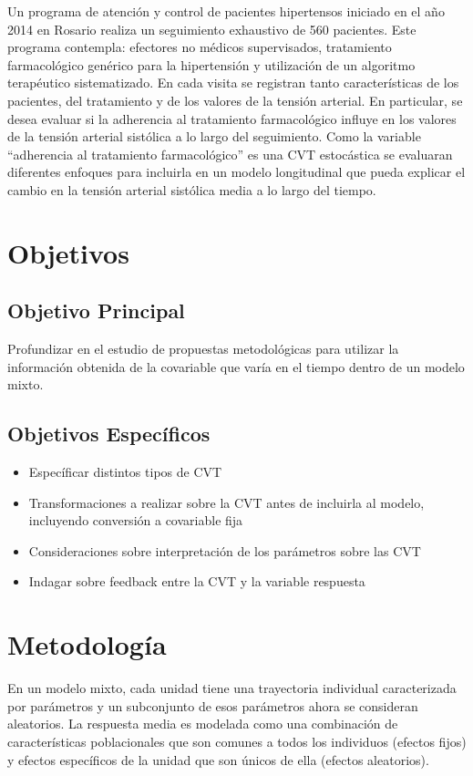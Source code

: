 \documentclass[12pt]{article}
\def\npatients{560}
\def\fullcovname{adherencia al tratamiento farmacológico}
\def\cvt{covariable que varía en el tiempo}
\begin{document}
Un programa de atención y control de pacientes hipertensos iniciado en el año 2014 en Rosario realiza un seguimiento
exhaustivo de \npatients{} pacientes. Este programa contempla: efectores no médicos supervisados, tratamiento farmacológico
genérico para la hipertensión y utilización de un algoritmo terapéutico sistematizado. En cada visita se registran tanto
características de los pacientes, del tratamiento y de los valores de la tensión arterial. En particular, se desea evaluar
si la adherencia al tratamiento farmacológico influye en los valores de la tensión arterial sistólica a lo largo del
seguimiento. Como la variable “\fullcovname{}” es una CVT estocástica se evaluaran diferentes enfoques para incluirla en un
modelo longitudinal que pueda explicar el cambio en la tensión arterial sistólica media a lo largo del tiempo.

\newpage
\section{Objetivos}

\subsection{Objetivo Principal}

Profundizar en el estudio de propuestas metodológicas para utilizar la información obtenida de la \cvt{} dentro de un
modelo mixto.

\subsection{Objetivos Específicos}

\begin{itemize}
	\item Específicar distintos tipos de CVT
	\item Transformaciones a realizar sobre la CVT antes de incluirla al modelo, incluyendo conversión a covariable fija
	\item Consideraciones sobre interpretación de los parámetros sobre las CVT
	\item Indagar sobre feedback entre la CVT y la variable respuesta
\end{itemize}

\newpage
\section{Metodología}

En un modelo mixto, cada unidad tiene una trayectoria individual caracterizada por parámetros y un subconjunto de esos
parámetros ahora se consideran aleatorios. La respuesta media es modelada como una combinación de características
poblacionales que son comunes a todos los individuos (efectos fijos) y efectos específicos de la unidad que son únicos de
ella (efectos aleatorios).
\end{document}
